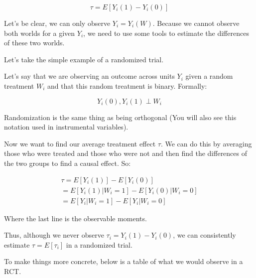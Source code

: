 \documentclass{article}
\begin{document}
\begin{equation}
    \tau = E [Y_i (1) - Y_i (0)]
\end{equation}

Let's be clear, we can only observe $Y_i = Y_i (W)$. Because we cannot observe both worlds for a given $Y_i$, we need to use some tools to estimate the differences of these two worlds.

Let's take the simple example of a randomized trial.

Let's say that we are observing an outcome across units $Y_i$ given a random treatment  $W_i$ and that this random treatment is binary. Formally:

\begin{equation}
    {Y_i(0), Y_i(1)} \perp W_i
\end{equation}

Randomization is the same thing as being orthogonal (You will also see this notation used in instrumental variables).

Now we want to find our average treatment effect $\tau$. We can do this by averaging those who were treated and those who were not and then find the differences of the two groups to find a causal effect. So:

\begin{equation}
\begin{aligned}
    \tau = E[Y_i(1)] - E[Y_i(0)] \\
    = E[Y_i (1) | W_i =1 ] - E[Y_i (0) | W_i = 0] \\
    = E [Y_i | W_i = 1] - E[Y_i | W_i = 0]
    \end{aligned}
\end{equation}

Where the last line is the observable moments.

Thus, although we never observe $\tau_i = Y_i(1) - Y_i(0)$, we can consistently estimate $\tau = E[\tau_i]$ in a randomized trial.

To make things more concrete, below is a table of what we would observe in a RCT.
\end{document}
